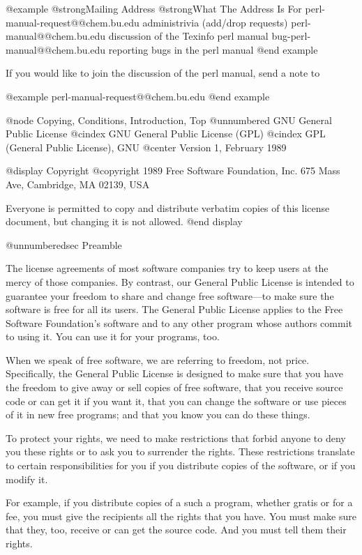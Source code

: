 @example
@strong{Mailing Address}                     @strong{What The Address Is For}
perl-manual-request@@chem.bu.edu    administrivia (add/drop requests)
perl-manual@@chem.bu.edu            discussion of the Texinfo perl manual
bug-perl-manual@@chem.bu.edu        reporting bugs in the perl manual
@end example

If you would like to join the discussion of the perl manual, send a note to

@example
perl-manual-request@@chem.bu.edu
@end example

@node Copying, Conditions, Introduction, Top
@unnumbered GNU General Public License
@cindex GNU General Public License (GPL)
@cindex GPL (General Public License), GNU
@center Version 1, February 1989

@display
Copyright @copyright{} 1989 Free Software Foundation, Inc.
675 Mass Ave, Cambridge, MA 02139, USA

Everyone is permitted to copy and distribute verbatim copies
of this license document, but changing it is not allowed.
@end display

@unnumberedsec Preamble

  The license agreements of most software companies try to keep users
at the mercy of those companies.  By contrast, our General Public
License is intended to guarantee your freedom to share and change free
software---to make sure the software is free for all its users.  The
General Public License applies to the Free Software Foundation's
software and to any other program whose authors commit to using it.
You can use it for your programs, too.

  When we speak of free software, we are referring to freedom, not
price.  Specifically, the General Public License is designed to make
sure that you have the freedom to give away or sell copies of free
software, that you receive source code or can get it if you want it,
that you can change the software or use pieces of it in new free
programs; and that you know you can do these things.

  To protect your rights, we need to make restrictions that forbid
anyone to deny you these rights or to ask you to surrender the rights.
These restrictions translate to certain responsibilities for you if you
distribute copies of the software, or if you modify it.

  For example, if you distribute copies of a such a program, whether
gratis or for a fee, you must give the recipients all the rights that
you have.  You must make sure that they, too, receive or can get the
source code.  And you must tell them their rights.

